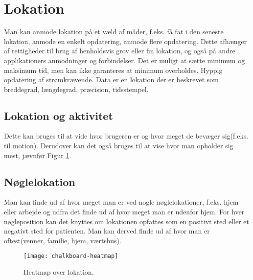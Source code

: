 \section{Lokation}
Man kan anmode lokation på et væld af måder, f.eks. få fat i den seneste lokation, anmode en enkelt opdatering, anmode flere opdatering. 
Dette afhænger af rettigheder til brug af henholdsvis grov eller fin lokation, og også på andre applikationers anmodninger og forbindelser. Det er muligt at sætte minimum og maksimum tid, men kan ikke garanteres at minimum overholdes. Hyppig opdatering af strømkrævende. 
Data er en lokation der er beskrevet som breddegrad, længdegrad, præcision, tidsstempel.

\subsection{Lokation og aktivitet}
Dette kan bruges til at vide hvor brugeren er og hvor meget de bevæger sig(f.eks. til motion).
Derudover kan det også bruges til at vise hvor man opholder sig mest, jævnfør Figur \ref{heatmap}.
\subsection{Nøglelokation}
Man kan finde ud af hvor meget man er ved nogle nøglelokationer, f.eks. hjem eller arbejde og udfra det finde ud af hvor meget man er udenfor hjem. 
For hver nøgleposition kan det knyttes om lokationen opfattes som en positivt sted eller et negativt sted for patienten.
Man kan derved finde ud af hvor man er oftest(venner, familie, hjem, værtshus).

\begin{figure}[h]
	\centering
	\texttt{[image: chalkboard-heatmap]}
	\caption{Heatmap over lokation.}\label{heatmap}
\end{figure}
